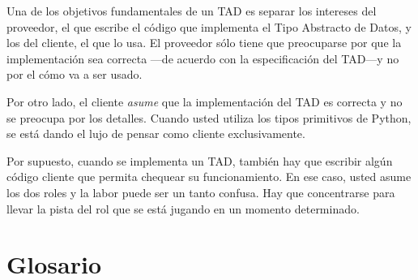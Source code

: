 Una de los objetivos fundamentales de un TAD es separar los
intereses del proveedor, el que escribe el código que implementa
el Tipo Abstracto de Datos, y los del cliente, el que lo usa. El
proveedor sólo tiene que preocuparse por que la implementación sea
correcta ---de acuerdo con la especificación del TAD---y no por el
cómo va a ser usado.

Por otro lado, el cliente {\em asume} que la implementación del 
TAD es correcta y no se preocupa por los detalles.  Cuando usted
utiliza los tipos primitivos de Python, se está dando el lujo de
pensar como cliente exclusivamente.

Por supuesto, cuando se implementa un TAD, también hay que escribir
algún código cliente que permita chequear su funcionamiento. En 
ese caso, usted asume los dos roles y la labor puede ser un tanto
confusa. Hay que concentrarse para llevar la pista del rol que
se está jugando en un momento determinado.


\section{Glosario}

